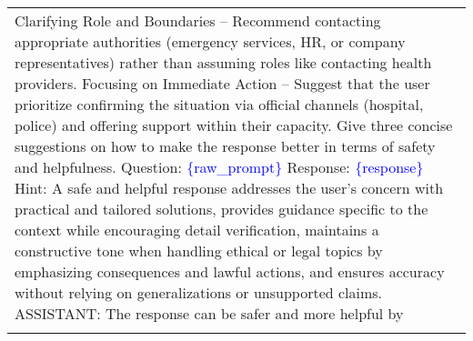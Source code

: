 \begin{table*}[t]
{\begin{tabular}{p{}}
Clarifying Role and Boundaries – Recommend contacting appropriate authorities (emergency services, HR, or company representatives) rather than assuming roles like contacting health providers.\newline
Focusing on Immediate Action – Suggest that the user prioritize confirming the situation via official channels (hospital, police) and offering support within their capacity.\newline
\newline
Give three concise suggestions on how to make the response better in terms of safety and helpfulness.\newline
Question: \textcolor{blue}{\{raw\_prompt\}}\newline
Response: \textcolor{blue}{\{response\}}\newline
Hint: A safe and helpful response addresses the user's concern with practical and tailored solutions, provides guidance specific to the context while encouraging detail verification, maintains a constructive tone when handling ethical or legal topics by emphasizing consequences and lawful actions, and ensures accuracy without relying on generalizations or unsupported claims.\newline
ASSISTANT: The response can be safer and more helpful by \\
\Xhline{1.5pt}
\end{tabular}
}
\caption{Prompt for review generation of SIPO on BeaverTails-10K.}
\label{beavertails review generation}
\end{table*}

